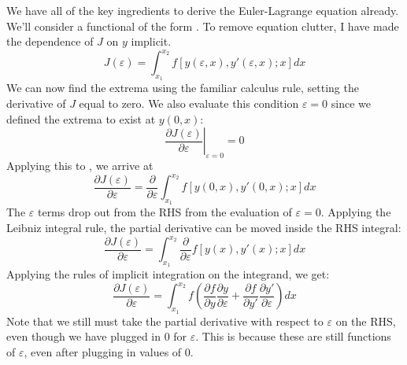 We have all of the key ingredients to derive the Euler-Lagrange equation already. We'll consider a functional of the form . To remove equation clutter, I have made the dependence of $J$ on $y$ implicit.
\begin{equation}\label{eq:neighborhood functional}
    J(\varepsilon)=\int_{x_1}^{x_2}f\left[y(\varepsilon,x),y'(\varepsilon,x);x\right]{dx}
\end{equation}
We can now find the extrema using the familiar calculus rule, setting the derivative of $J$ equal to zero. We also evaluate this condition $\varepsilon=0$ since we defined the extrema to exist at $y(0,x)$:
\begin{equation}
    \left.\frac{\partial J(\varepsilon)}{\partial\varepsilon}\right\vert_{\varepsilon=0}=0
\end{equation}
Applying this to , we arrive at
\begin{equation}\label{eq:neighborhood functional diff}
    \frac{\partial J(\varepsilon)}{\partial\varepsilon}= \frac{\partial}{\partial\varepsilon}\int_{x_1}^{x_2}f\left[y(0,x),y'(0,x);x\right]{dx}
\end{equation}
The $\varepsilon$ terms drop out from the RHS from the evaluation of $\varepsilon=0$. Applying the Leibniz integral rule, the partial derivative can be moved inside the RHS integral:
\begin{equation}
    \frac{\partial J(\varepsilon)}{\partial\varepsilon}= \int_{x_1}^{x_2}\frac{\partial}{\partial\varepsilon}f\left[y(x),y'(x);x\right]{dx}
\end{equation}
Applying the rules of implicit integration on the integrand, we get:
\begin{equation}\label{eq:diff functional}
    \frac{\partial J(\varepsilon)}{\partial\varepsilon}= \int_{x_1}^{x_2}f\left(\frac{\partial f}{\partial y}\frac{\partial y}{\partial\varepsilon}+\frac{\partial f}{\partial y'}\frac{\partial y'}{\partial\varepsilon}\right){dx}
\end{equation}
Note that we still must take the partial derivative with respect to $\varepsilon$ on the RHS, even though we have plugged in 0 for $\varepsilon$. This is because these are still functions of $\varepsilon$, even after plugging in values of 0.

